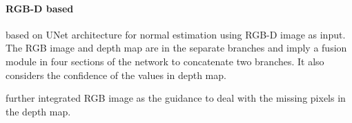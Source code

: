 \paragraph{RGB-D based}
\cite{hfm} based on UNet architecture for normal estimation using RGB-D image as input. The RGB image and depth map are in the separate branches and imply a fusion module in four sections of the network to concatenate two branches. It also considers the confidence of the values in depth map.

\cite{depth-enhance-guided} further integrated RGB image as the guidance to deal with the missing pixels in the depth map. 








